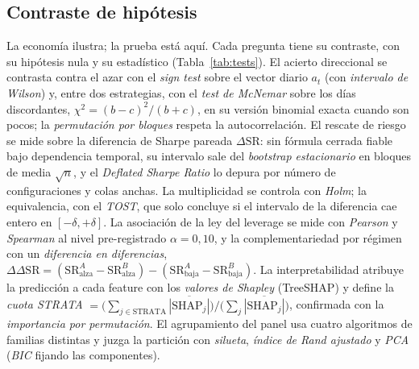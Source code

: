 \subsection{Contraste de hipótesis}
\label{sec:tests}

La economía ilustra; la prueba está aquí. Cada pregunta tiene su contraste, con su hipótesis nula y su estadístico (Tabla~\ref{tab:tests}). El acierto direccional se contrasta contra el azar con el \emph{sign test} sobre el vector diario $a_t$ (con \emph{intervalo de Wilson}) y, entre dos estrategias, con el \emph{test de McNemar} sobre los días discordantes, $\chi^2 = (b-c)^2/(b+c)$, en su versión binomial exacta cuando son pocos; la \emph{permutación por bloques} respeta la autocorrelación. El rescate de riesgo se mide sobre la diferencia de Sharpe pareada $\Delta\mathrm{SR}$: sin fórmula cerrada fiable bajo dependencia temporal, su intervalo sale del \emph{bootstrap estacionario} en bloques de media $\sqrt{n}$, y el \emph{Deflated Sharpe Ratio} lo depura por número de configuraciones y colas anchas. La multiplicidad se controla con \emph{Holm}; la equivalencia, con el \emph{TOST}, que solo concluye si el intervalo de la diferencia cae entero en $[-\delta,+\delta]$. La asociación de la ley del leverage se mide con \emph{Pearson} y \emph{Spearman} al nivel pre-registrado $\alpha = 0{,}10$, y la complementariedad por régimen con un \emph{diferencia en diferencias}, $\Delta\Delta\mathrm{SR} = (\mathrm{SR}^{A}_{\text{alza}} - \mathrm{SR}^{B}_{\text{alza}}) - (\mathrm{SR}^{A}_{\text{baja}} - \mathrm{SR}^{B}_{\text{baja}})$. La interpretabilidad atribuye la predicción a cada feature con los \emph{valores de Shapley} (TreeSHAP) y define la \emph{cuota STRATA} $= \big(\sum_{j \in \text{STRATA}} \overline{|\mathrm{SHAP}_j|}\big) / \big(\sum_{j} \overline{|\mathrm{SHAP}_j|}\big)$, confirmada con la \emph{importancia por permutación}. El agrupamiento del panel usa cuatro algoritmos de familias distintas y juzga la partición con \emph{silueta}, \emph{índice de Rand ajustado} y \emph{PCA} (\emph{BIC} fijando las componentes).

